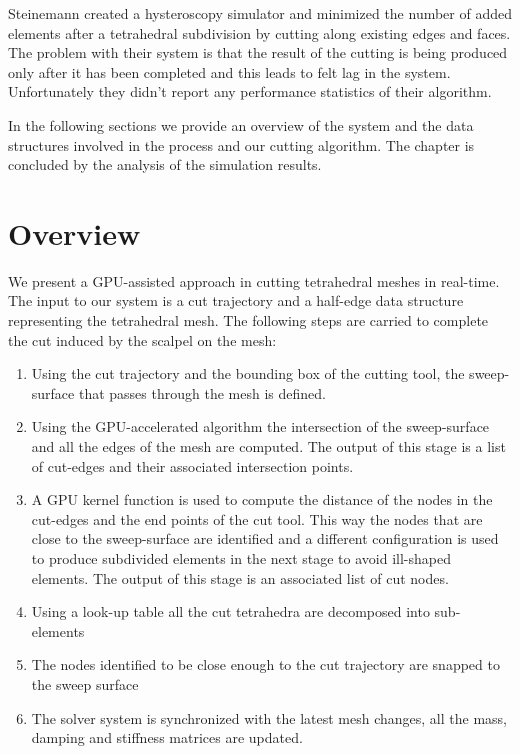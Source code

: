 Steinemann \etal \cite{Steinemann} created a hysteroscopy simulator and minimized the number of added elements 
after a tetrahedral subdivision by cutting along existing edges and faces. The problem with their system is that
the result of the cutting is being produced only after it has been completed and this leads to felt lag in the system. 
Unfortunately they didn't report any performance statistics of their algorithm. 

In the following sections we provide an overview of the system and the data structures involved in the process 
and our cutting algorithm. The chapter is concluded by the analysis of the simulation results.

\section{Overview}
We present a GPU-assisted approach in cutting tetrahedral meshes in real-time. 
The input to our system is a cut trajectory and a half-edge data structure representing the tetrahedral mesh. 
The following steps are carried to complete the cut induced by the scalpel on the mesh:

\begin{enumerate}
 \item Using the cut trajectory and the bounding box of the cutting tool, the sweep-surface that passes through 
 the mesh is defined.
 \item Using the GPU-accelerated algorithm the intersection of the sweep-surface and all the edges of the mesh 
 are computed. The output of this stage is a list of cut-edges and their associated intersection points. 
 
 \item A GPU kernel function is used to compute the distance of the nodes in the cut-edges and the end points of 
 the cut tool. This way the nodes that are close to the sweep-surface are identified and a different configuration 
 is used to produce subdivided elements in the next stage to avoid ill-shaped elements. The output of this stage is an
 associated list of cut nodes.
 
 \item Using a look-up table all the cut tetrahedra are decomposed into sub-elements
 
 \item The nodes identified to be close enough to the cut trajectory are snapped to the sweep surface
 
 \item The solver system is synchronized with the latest mesh changes, all the mass, damping and stiffness 
 matrices are updated.
\end{enumerate}


